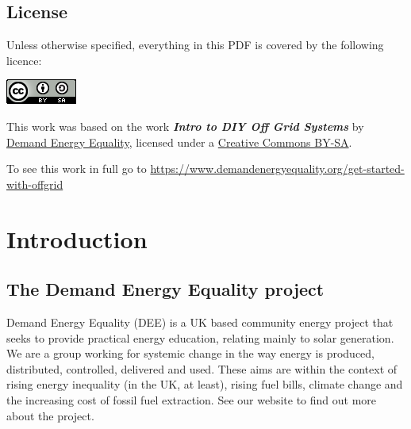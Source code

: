 \documentclass{article}
\theoremstyle{definition}
\theoremstyle{definition}
\theoremstyle{remark}
\begin{document}

  {\color{blue}\subsection*{License}} %
  \label{sub:license}

    Unless otherwise specified, everything in this PDF is covered by the following licence:

    \includegraphics[]{../Images/image_0_2_(license).png} \newline

    This work was based on the work \textbf{\textit{Intro to DIY Off Grid Systems}} by \href{https://www.demandenergyequality.org/}{Demand Energy Equality}, licensed under a \href{https://creativecommons.org/licenses/by-sa/4.0/legalcode}{Creative Commons BY-SA}.

    To see this work in full go to \href{https://www.demandenergyequality.org/get-started-with-offgrid}{https://www.demandenergyequality.org/get-started-with-offgrid}
  


\newpage

{\color{blue}\section{Introduction}} %
\label{sec:introduction}

  {\color{blue}\subsection{The Demand Energy Equality project}} %
  \label{sub:the_demand_energy_equality_project}

    Demand Energy Equality (DEE) is a UK based community energy project that seeks to provide practical energy education, relating mainly to solar generation. We are a group working for systemic change in the way energy is produced, distributed, controlled, delivered and used. These aims are within the context of rising energy inequality (in the UK, at least), rising fuel bills, climate change and the increasing cost of fossil fuel extraction. See our website to find out more about the project.
\end{document}
